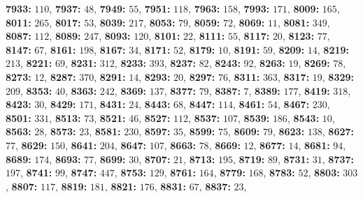 \textsf{\bfseries 7933:} $110$, \textsf{\bfseries 7937:} $48$, \textsf{\bfseries 7949:} $55$, \textsf{\bfseries 7951:} $118$, \textsf{\bfseries 7963:} $158$, \textsf{\bfseries 7993:} $171$, \textsf{\bfseries 8009:} $165$, \textsf{\bfseries 8011:} $265$, \textsf{\bfseries 8017:} $53$, \textsf{\bfseries 8039:} $217$, \textsf{\bfseries 8053:} $79$, \textsf{\bfseries 8059:} $72$, \textsf{\bfseries 8069:} $11$, \textsf{\bfseries 8081:} $349$, \textsf{\bfseries 8087:} $112$, \textsf{\bfseries 8089:} $247$, \textsf{\bfseries 8093:} $120$, \textsf{\bfseries 8101:} $22$, \textsf{\bfseries 8111:} $55$, \textsf{\bfseries 8117:} $20$, \textsf{\bfseries 8123:} $77$, \textsf{\bfseries 8147:} $67$, \textsf{\bfseries 8161:} $198$, \textsf{\bfseries 8167:} $34$, \textsf{\bfseries 8171:} $52$, \textsf{\bfseries 8179:} $10$, \textsf{\bfseries 8191:} $59$, \textsf{\bfseries 8209:} $14$, \textsf{\bfseries 8219:} $213$, \textsf{\bfseries 8221:} $69$, \textsf{\bfseries 8231:} $312$, \textsf{\bfseries 8233:} $393$, \textsf{\bfseries 8237:} $82$, \textsf{\bfseries 8243:} $92$, \textsf{\bfseries 8263:} $19$, \textsf{\bfseries 8269:} $78$, \textsf{\bfseries 8273:} $12$, \textsf{\bfseries 8287:} $370$, \textsf{\bfseries 8291:} $14$, \textsf{\bfseries 8293:} $20$, \textsf{\bfseries 8297:} $76$, \textsf{\bfseries 8311:} $363$, \textsf{\bfseries 8317:} $19$, \textsf{\bfseries 8329:} $209$, \textsf{\bfseries 8353:} $40$, \textsf{\bfseries 8363:} $242$, \textsf{\bfseries 8369:} $137$, \textsf{\bfseries 8377:} $79$, \textsf{\bfseries 8387:} $7$, \textsf{\bfseries 8389:} $177$, \textsf{\bfseries 8419:} $318$, \textsf{\bfseries 8423:} $30$, \textsf{\bfseries 8429:} $171$, \textsf{\bfseries 8431:} $24$, \textsf{\bfseries 8443:} $68$, \textsf{\bfseries 8447:} $114$, \textsf{\bfseries 8461:} $54$, \textsf{\bfseries 8467:} $230$, \textsf{\bfseries 8501:} $331$, \textsf{\bfseries 8513:} $73$, \textsf{\bfseries 8521:} $46$, \textsf{\bfseries 8527:} $112$, \textsf{\bfseries 8537:} $107$, \textsf{\bfseries 8539:} $186$, \textsf{\bfseries 8543:} $10$, \textsf{\bfseries 8563:} $28$, \textsf{\bfseries 8573:} $23$, \textsf{\bfseries 8581:} $230$, \textsf{\bfseries 8597:} $35$, \textsf{\bfseries 8599:} $75$, \textsf{\bfseries 8609:} $79$, \textsf{\bfseries 8623:} $138$, \textsf{\bfseries 8627:} $77$, \textsf{\bfseries 8629:} $150$, \textsf{\bfseries 8641:} $204$, \textsf{\bfseries 8647:} $107$, \textsf{\bfseries 8663:} $78$, \textsf{\bfseries 8669:} $12$, \textsf{\bfseries 8677:} $14$, \textsf{\bfseries 8681:} $94$, \textsf{\bfseries 8689:} $174$, \textsf{\bfseries 8693:} $77$, \textsf{\bfseries 8699:} $30$, \textsf{\bfseries 8707:} $21$, \textsf{\bfseries 8713:} $195$, \textsf{\bfseries 8719:} $89$, \textsf{\bfseries 8731:} $31$, \textsf{\bfseries 8737:} $197$, \textsf{\bfseries 8741:} $99$, \textsf{\bfseries 8747:} $447$, \textsf{\bfseries 8753:} $129$, \textsf{\bfseries 8761:} $164$, \textsf{\bfseries 8779:} $168$, \textsf{\bfseries 8783:} $52$, \textsf{\bfseries 8803:} $303$, \textsf{\bfseries 8807:} $117$, \textsf{\bfseries 8819:} $181$, \textsf{\bfseries 8821:} $176$, \textsf{\bfseries 8831:} $67$, \textsf{\bfseries 8837:} $23$, 
